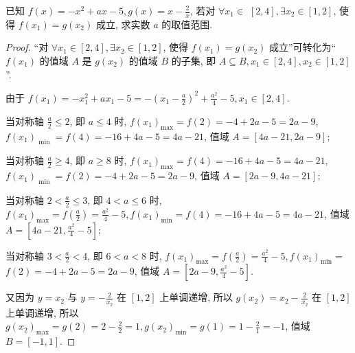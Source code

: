 \begin{variation}\label{variation:2.1.11}
  已知 \(f(x)  =  -{x}^{2} + {ax} -5, g(x)  = x -\frac{2}{x}\), 若对 \(\forall {x}_{1} \in\)  \(\left\lbrack  {2, 4}\right\rbrack  , \exists {x}_{2} \in  \left\lbrack  {1, 2}\right\rbrack\), 使得 \(f\left( {x}_{1}\right)  = g\left( {x}_{2}\right)\) 成立, 求实数 \(a\) 的取值范围.
\end{variation}

\begin{proof}
  “对 \(\forall {x}_{1} \in  \left\lbrack  {2, 4}\right\rbrack  , \exists {x}_{2} \in  \left\lbrack  {1, 2}\right\rbrack\), 使得 \(f\left( {x}_{1}\right)  = g\left( {x}_{2}\right)\) 成立”可转化为“ \(f\left( {x}_{1}\right)\) 的值域 \(A\) 是 \(g\left( {x}_{2}\right)\) 的值域 \(B\) 的子集, 即 \(A \subseteq  B, {x}_{1} \in  \left\lbrack  {2, 4}\right\rbrack  , {x}_{2} \in  \left\lbrack  {1, 2}\right\rbrack\) ”.

由于 \(f\left( {x}_{1}\right)  =  -{x}_{1}^{2} + a{x}_{1} -5 =  -{\left( {x}_{1} -\frac{a}{2}\right) }^{2} + \frac{{a}^{2}}{4} -5, {x}_{1} \in  \left\lbrack  {2, 4}\right\rbrack\).

当对称轴 \(\frac{a}{2} \leq  2\), 即 \(a \leq  4\) 时, \(f{\left( {x}_{1}\right) }_{\max } = f\left( 2\right)  =  -4 + {2a} -5 = {2a} -9\), \(f{\left( {x}_{1}\right) }_{\text{ min }} = f\left( 4\right)  =  -{16} + {4a} -5 = {4a} -{21}\), 值域 \(A = \left\lbrack  {{4a} -{21}, {2a} -9}\right\rbrack\);

当对称轴 \(\frac{a}{2} \geq  4\), 即 \(a \geq  8\) 时, \(f{\left( {x}_{1}\right) }_{\max } = f\left( 4\right)  =  -{16} + {4a} -5 = {4a} -{21}\), \(f{\left( {x}_{1}\right) }_{\text{ min }} = f\left( 2\right)  =  -4 + {2a} -5 = {2a} -9\), 值域 \(A = \left\lbrack  {{2a} -9, {4a} -{21}}\right\rbrack\);

当对称轴 \(2 < \frac{a}{2} \leq  3\), 即 \(4 < a \leq  6\) 时, \(f{\left( {x}_{1}\right) }_{\max } = f\left( \frac{a}{2}\right)  = \frac{{a}^{2}}{4} -5, f{\left( {x}_{1}\right) }_{\min } = f\left( 4\right)  =  -{16} + {4a} -5 = {4a} -{21}\), 值域 \(A = \left\lbrack  {{4a} -{21}, \frac{{a}^{2}}{4} -5}\right\rbrack\);

当对称轴 \(3 < \frac{a}{2} < 4\), 即 \(6 < a < 8\) 时, \(f{\left( {x}_{1}\right) }_{\max } = f\left( \frac{a}{2}\right)  = \frac{{a}^{2}}{4} -5, f{\left( {x}_{1}\right) }_{\min } =\)  \(f\left( 2\right)  =  -4 + {2a} -5 = {2a} -9\), 值域 \(A = \left\lbrack  {{2a} -9, \frac{{a}^{2}}{4} -5}\right\rbrack\).

又因为 \(y = {x}_{2}\) 与 \(y =  -\frac{2}{{x}_{2}}\) 在 \(\left\lbrack  {1, 2}\right\rbrack\) 上单调递增, 所以 \(g\left( {x}_{2}\right)  = {x}_{2} -\frac{2}{{x}_{2}}\) 在 \(\left\lbrack  {1, 2}\right\rbrack\) 上单调递增, 所以 \(g{\left( {x}_{2}\right) }_{\max } = g\left( 2\right)  = 2 -\frac{2}{2} = 1, g{\left( {x}_{2}\right) }_{\min } = g\left( 1\right)  = 1 -\frac{2}{1} =  -1\), 值域 \(B = \left\lbrack  {-1, 1}\right\rbrack\).


\end{proof}
